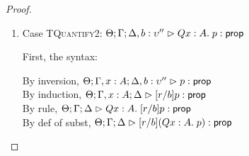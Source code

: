 \begin{proof}
\begin{enumerate}
  For semantics, consider
  $\interp{\judgeA[\Theta; \Gamma; \Delta]
                  {[r/b](Q u:\upsilon.\;p)}{\assert}}\;\theta\;\gamma\;\delta$ 
  \begin{eqnproof}
          {Semantics}
          {Induction}
          {Semantics}
  \end{eqnproof}

\item Case \textsc{TQuantify2}: $\judgeA[\Theta; \Gamma; \Delta, b:\upsilon'']{Q x:A.\;p}{\assert}$
  
  First, the syntax:
  \begin{tabbedproof}
    \oo By inversion, $\judgeA[\Theta; \Gamma, x:A; \Delta, b:\upsilon'']{p}{\assert}$ \\
    \oo By induction, $\judgeA[\Theta; \Gamma, x:A; \Delta]{[r/b]p}{\assert}$ \\
    \oo By rule, $\judgeA[\Theta; \Gamma; \Delta]
                         {Q x:A.\;[r/b]p}{\assert}$ \\
    \oo By def of subst, $\judgeA[\Theta; \Gamma; \Delta]
                                 {[r/b](Q x:A.\;p)}{\assert}$ 
  \end{tabbedproof}


\end{enumerate}
\end{proof}
